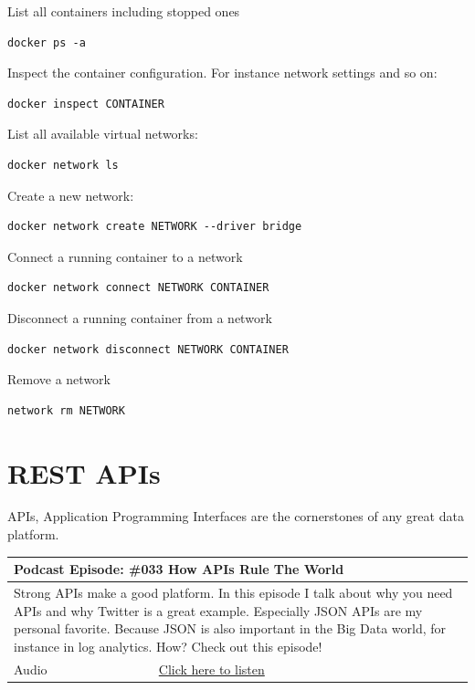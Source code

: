 \documentclass[12pt, numbers=noenddot]{scrreprt} %
\begin{document}
List all containers including stopped ones
\begin{lstlisting}
docker ps -a
\end{lstlisting}

Inspect the container configuration. For instance network settings and so on:
\begin{lstlisting}
docker inspect CONTAINER
\end{lstlisting}

List all available virtual networks:
\begin{lstlisting}
docker network ls
\end{lstlisting}

Create a new network:
\begin{lstlisting}
docker network create NETWORK --driver bridge
\end{lstlisting}

Connect a running container to a network
\begin{lstlisting}
docker network connect NETWORK CONTAINER
\end{lstlisting}

Disconnect a running container from a network
\begin{lstlisting}
docker network disconnect NETWORK CONTAINER
\end{lstlisting}

Remove  a network
\begin{lstlisting}
network rm NETWORK
\end{lstlisting}


\chapter{REST APIs}
APIs, Application Programming Interfaces are the cornerstones of any great data platform. 

\begin{table}[h]
\begin{tabular}{ll}
\hline
\multicolumn{2}{l}{\textbf{Podcast Episode:} \#033 How APIs Rule The World} \\ \hline
\multicolumn{2}{p{15cm}}{Strong APIs make a good platform. In this episode I talk about why you need APIs and why Twitter is a great example. Especially JSON APIs are my personal favorite. Because JSON is also important in the Big Data world, for instance in log analytics. How? Check out this episode!}         \\ \hline
\multicolumn{1}{l|}{Audio}     & \href{https://anchor.fm/andreaskayy/episodes/How-APIs-Rule-The-World--PoDS-033-e24ttq}{Click here to listen}   \\ \hline
\end{tabular}
\end{table}
\end{document}

